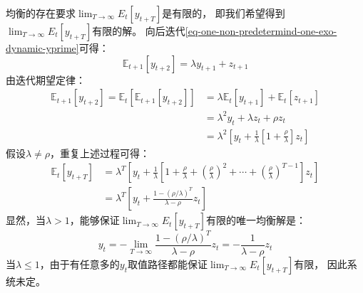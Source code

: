 \begin{example}
    均衡的存在要求$\lim_{T\rightarrow \infty}E_t\left[y_{t+T}\right]$是有限的，
    即我们希望得到$\lim_{T\rightarrow \infty}E_t\left[y_{t+T}\right]$有限的解。
    向后迭代\cref{eq-one-non-predetermind-one-exo-dynamic-yprime}可得：
    \begin{equation*}
        \mathbb{E}_{t+1}[y_{t+2}] = \lambda y_{t+1} + z_{t+1}
    \end{equation*}
    由迭代期望定律：
    \begin{equation*}
        \begin{aligned}
            \mathbb{E}_{t+1}[y_{t+2}] = \mathbb{E}_{t}\left[\mathbb{E}_{t+1}\left[y_{t+2}\right]\right]
                &= \lambda \mathbb{E}_t \left[y_{t+1}\right] + \mathbb{E}_t\left[z_{t+1}\right]  \\
                &= \lambda^2y_t + \lambda z_t + \rho z_t  \\
                &= \lambda^2\left[y_t+\frac{1}{\lambda}\left[1+\frac{\rho}{\lambda}\right]z_t\right]
        \end{aligned}
    \end{equation*}
    假设$\lambda \neq \rho$，重复上述过程可得：
    \begin{equation*}
        \begin{aligned}
            \mathbb{E}_t \left[y_{t+T}\right] &= 
            \lambda^T\left[y_t + \frac{1}{\lambda}\left[1 + \frac{\rho}{\lambda} + 
            \left(\frac{\rho}{\lambda}\right)^2+\cdots+\left(\frac{\rho}{\lambda}\right)^{T-1}\right]z_t\right] \\
                &= \lambda^T\left[y_t + \frac{1-\left(\rho / \lambda\right)^T}{\lambda-\rho}z_t\right]
        \end{aligned}
    \end{equation*}
    显然，当$\lambda > 1$，能够保证$\lim_{T\rightarrow \infty}E_t\left[y_{t+T}\right]$有限的唯一均衡解是：
    \begin{equation*}
        y_t = -\lim_{T\rightarrow \infty}\frac{1-\left(\rho/\lambda\right)^T}{\lambda - \rho}z_t 
            = -\frac{1}{\lambda-\rho}z_t
    \end{equation*}
    当$\lambda\leq 1$，由于有任意多的$y_t$取值路径都能保证$\lim_{T\rightarrow \infty}E_t\left[y_{t+T}\right]$有限，
    因此系统未定。
\end{example}

